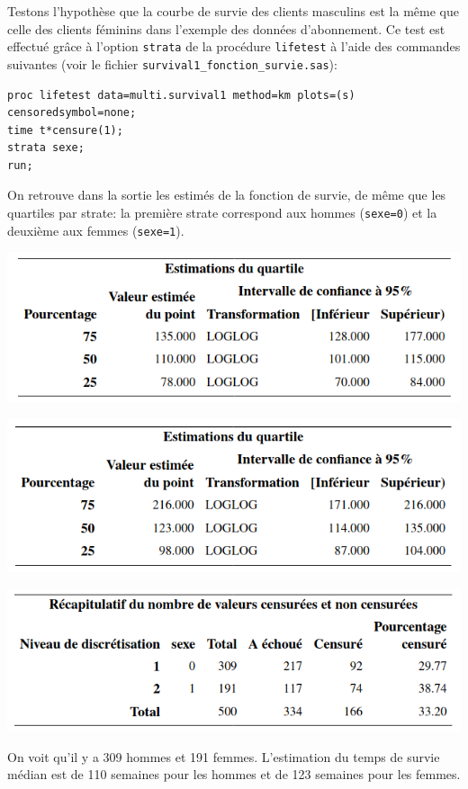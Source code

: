 \documentclass[
  11pt,
  letterpaper,
]{book}
\theoremstyle{definition}
\theoremstyle{definition}
\theoremstyle{definition}
\theoremstyle{remark}
\begin{document}
Testons l'hypothèse que la courbe de survie des clients masculins est la même que celle des clients féminins dans l'exemple des données d'abonnement. Ce test est effectué grâce à l'option \texttt{strata} de la procédure \texttt{lifetest} à l'aide des commandes suivantes (voir le fichier \texttt{survival1\_fonction\_survie.sas}):

\begin{verbatim}
proc lifetest data=multi.survival1 method=km plots=(s) censoredsymbol=none;
time t*censure(1);
strata sexe;
run;
\end{verbatim}

On retrouve dans la sortie les estimés de la fonction de survie, de même que les quartiles par strate: la première strate correspond aux hommes (\texttt{sexe=0}) et la deuxième aux femmes (\texttt{sexe=1}).

\begin{center}\includegraphics[width=0.75\linewidth]{figures/05-survie-e6} \end{center}

\begin{center}\includegraphics[width=0.75\linewidth]{figures/05-survie-e7} \end{center}

\begin{center}\includegraphics[width=0.75\linewidth]{figures/05-survie-e8} \end{center}

On voit qu'il y a 309 hommes et 191 femmes. L'estimation du temps de survie médian est de 110 semaines pour les hommes et de 123 semaines pour les femmes.
\end{document}
